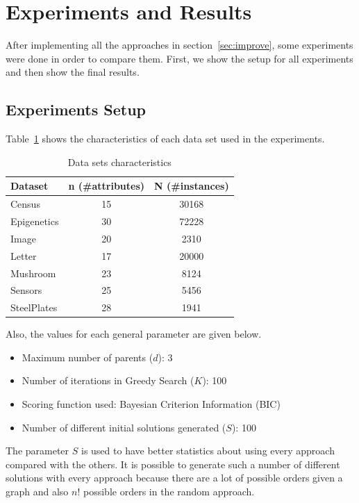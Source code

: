 \section{Experiments and Results}
\label{sec:experiments}

After implementing all the approaches in section~\ref{sec:improve}, some experiments were done in order to compare them. First, we show the setup for all experiments and then show the final results.

\subsection{Experiments Setup}
\label{subsec:configuration}
	Table~\ref{tab:datasets} shows the characteristics of each data set used in the experiments.
	\begin{table}[ h ]
		\centering
		\begin{tabular}{ | l | c | c | }
			\hline
			Dataset & n (\#attributes) & N (\#instances) \\ \hline
			Census & 15 & 30168 \\ \hline
			Epigenetics & 30 & 72228 \\ \hline
			Image & 20 & 2310 \\ \hline
			Letter & 17 & 20000 \\ \hline
			Mushroom & 23 & 8124 \\ \hline
			Sensors & 25 & 5456 \\ \hline
			SteelPlates & 28 & 1941 \\ \hline
		\end{tabular}
		\caption{Data sets characteristics}
		\label{tab:datasets}
	\end{table}
	Also, the values for each general parameter are given below.
	\begin{itemize}
		\item Maximum number of parents ($d$): 3
		\item Number of iterations in Greedy Search ($K$): 100
		\item Scoring function used: Bayesian Criterion Information (BIC)
		\item Number of different initial solutions generated ($S$): 100
	\end{itemize}
	The parameter $S$ is used to have better statistics about using every approach compared with the others. It is possible to generate such a number of different solutions with every approach because there are a lot of possible orders given a graph and also $n!$ possible orders in the random approach.


